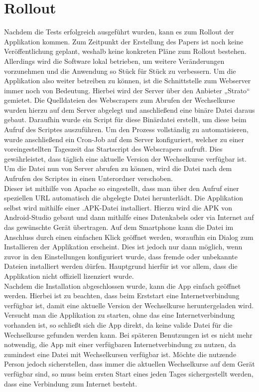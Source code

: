 \documentclass[conference]{IEEEtran}
\begin{document}
\section{Rollout}
Nachdem die Tests erfolgreich ausgeführt wurden, kann es zum Rollout der Applikation kommen. Zum Zeitpunkt der Erstellung des Papers ist noch keine Veröffentlichung geplant, weshalb keine konkreten Pläne zum Rollout bestehen. \\
Allerdings wird die Software lokal betrieben, um weitere Veränderungen vorzunehmen und die Anwendung so Stück für Stück zu verbessern. Um die Applikation also weiter betreiben zu können, ist die Schnittstelle zum Webserver immer noch von Bedeutung. Hierbei wird der Server über den Anbieter „Strato“ gemietet. Die Quelldateien des Webscrapers zum Abrufen der Wechselkurse wurden hierzu auf dem Server abgelegt und anschließend eine binäre Datei daraus gebaut. Daraufhin wurde ein Script für diese Binärdatei erstellt, um diese beim Aufruf des Scriptes auszuführen. Um den Prozess vollständig zu automatisieren, wurde anschließend ein Cron-Job auf dem Server konfiguriert, welcher zu einer voreingestellten Tageszeit das Startscript des Webscrapers aufruft. Dies gewährleistet, dass täglich eine aktuelle Version der Wechselkurse verfügbar ist. Um die Datei nun von Server abrufen zu können, wird die Datei nach dem Aufrufen des Scriptes in einen Unterordner verschoben. \\
Dieser ist mithilfe von Apache so eingestellt, dass man über den Aufruf einer speziellen URL automatisch die abgelegte Datei herunterlädt. Die Applikation selbst wird mithilfe einer .APK-Datei installiert. Hierzu wird die APK von Android-Studio gebaut und dann mithilfe eines Datenkabels oder via Internet auf das gewünschte Gerät übertragen. Auf dem Smartphone kann die Datei im Anschluss durch einen einfachen Klick
geöffnet werden, woraufhin ein Dialog zum Installieren der Applikation erscheint. Dies ist jedoch nur dann möglich, wenn zuvor in den Einstellungen konfiguriert wurde, dass fremde oder unbekannte Dateien installiert werden dürfen. Hauptgrund hierfür ist vor allem, dass die Applikation nicht offiziell lizenziert wurde. \\
Nachdem die Installation abgeschlossen wurde, kann die App einfach geöffnet werden. Hierbei ist zu beachten, dass beim Erststart eine Internetverbindung verfügbar ist, damit eine aktuelle Version der Wechselkurse heruntergeladen wird. Versucht man die Applikation zu starten, ohne das eine Internetverbindung vorhanden ist, so schließt sich die App direkt, da keine valide Datei für die Wechselkurse gefunden werden kann. Bei späteren Benutzungen ist es nicht mehr notwendig, die App mit einer verfügbaren Internetverbindung zu nutzen, da zumindest eine Datei mit Wechselkursen verfügbar ist. Möchte die nutzende Person jedoch sicherstellen, dass immer die aktuellen Wechselkurse auf dem Gerät verfügbar sind, so muss beim ersten Start eines jeden Tages sichergestellt werden, 
dass eine Verbindung zum Internet besteht.
\end{document}
